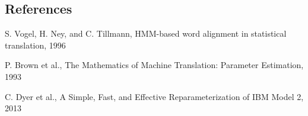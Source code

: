 \documentclass[final]{beamer}
\begin{document}
\begin{frame}[t]
\begin{multicols}{3}


\subsection{References}

\begin{thebibliography}{99}

 S. Vogel, H. Ney, and C. Tillmann, HMM-based word alignment in statistical translation, 1996

 P. Brown et al., The Mathematics of Machine Translation: Parameter Estimation, 1993

 C. Dyer et al., A Simple, Fast, and Effective Reparameterization of IBM Model 2, 2013


\end{thebibliography}

\end{multicols}

\end{frame}
\end{document}
